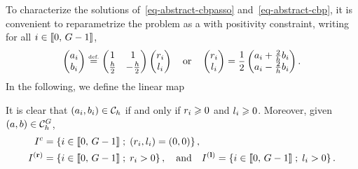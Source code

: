 To characterize the solutions of~\eqref{eq-abstract-cbpasso} and~\eqref{eq-abstract-cbp}, it is convenient to reparametrize the problem as a \lasso with positivity constraint, writing for all $i\in\llbracket 0,\,G-1 \rrbracket$,
\begin{align}
	\begin{pmatrix}
a_i\\b_i
\end{pmatrix}  \stackrel{\mbox{\upshape\tiny def.}}{=}  \begin{pmatrix}
    1&1\\ \frac{h}{2}&-\frac{h}{2}
  \end{pmatrix} \begin{pmatrix}
    r_i\\ l_i
  \end{pmatrix}
 	\quad\text{or}\quad
 	\begin{pmatrix}
    r_i\\l_i
  \end{pmatrix}=\frac{1}{2} \begin{pmatrix}
    a_i+\frac{2}{h} b_i\\
    a_i-\frac{2}{h} b_i\\
  \end{pmatrix}. 
\label{eq-cbp-cdv}
 \end{align}
In the following, we define the linear map
 
It is clear that $(a_i, b_i)\in\mathcal{C}_h$ if and only if $r_i\geqslant 0$ and $l_i\geqslant 0$. Moreover, given $(a, b)\in \mathcal{C}_h^G$,
  \begin{align*}
    I^c&=\left\{ i\in\llbracket 0,\,G-1 \rrbracket \;;\; (r_i,l_i)=(0,0) \right\},\\
    {I^{\mathbf{(r)}}} &=\left\{ i\in\llbracket 0,\,G-1 \rrbracket \;;\; r_i> 0 \right\}, 
\quad \text{and} \quad    {I^{\mathbf{(l)}}}=\left\{ i\in\llbracket 0,\,G-1 \rrbracket \;;\; l_i>0 \right\}.
  \end{align*}


